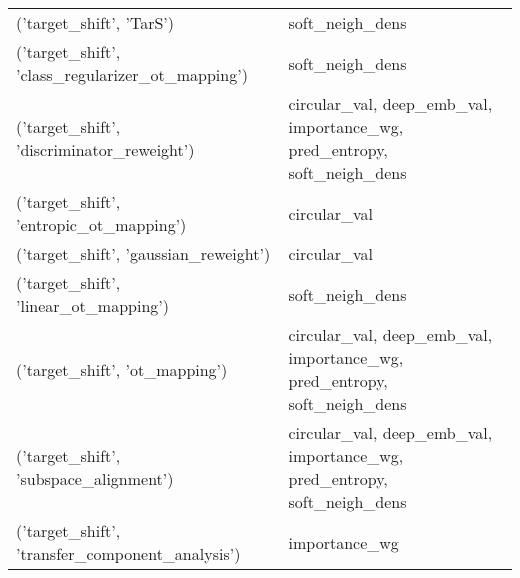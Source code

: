 \begin{tabular}{ll}
 ('target\_shift', 'TarS')                            & soft\_neigh\_dens                                                          \\
 ('target\_shift', 'class\_regularizer\_ot\_mapping')    & soft\_neigh\_dens                                                          \\
 ('target\_shift', 'discriminator\_reweight')          & circular\_val, deep\_emb\_val, importance\_wg, pred\_entropy, soft\_neigh\_dens \\
 ('target\_shift', 'entropic\_ot\_mapping')             & circular\_val                                                             \\
 ('target\_shift', 'gaussian\_reweight')               & circular\_val                                                             \\
 ('target\_shift', 'linear\_ot\_mapping')               & soft\_neigh\_dens                                                          \\
 ('target\_shift', 'ot\_mapping')                      & circular\_val, deep\_emb\_val, importance\_wg, pred\_entropy, soft\_neigh\_dens \\
 ('target\_shift', 'subspace\_alignment')              & circular\_val, deep\_emb\_val, importance\_wg, pred\_entropy, soft\_neigh\_dens \\
 ('target\_shift', 'transfer\_component\_analysis')     & importance\_wg                                                            \\
\hline
\end{tabular}